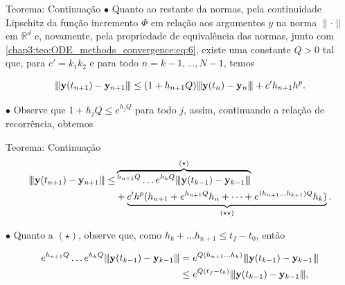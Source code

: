 \documentclass{beamer}
\newcommand{\vertiii}[1]{{\left\vert\kern-0.25ex\left\vert\kern-0.25ex\left\vert #1 
    \right\vert\kern-0.25ex\right\vert\kern-0.25ex\right\vert}}
\theoremstyle{plain}
\theoremstyle{definition}
\begin{document}

\begin{frame}{Teorema: Continuação}
    \phantom{aa} $\bullet$ Quanto ao restante da normas, pela continuidade Lipschitz da função incremento \(\Phi\) em relação aos argumentos \(y\) na norma \(\|\cdot\|\) em \(\mathbb{R}^{d}\) e, novamente, pela propriedade de equivalência das normas, junto com \eqref{chap3:teo:ODE_methods_convergence:eq:6}, existe uma constante \(Q>0\) tal que, para $c' = k_1 k_2$ e para todo $n = k - 1, \dots, N -1$, temos

    \[
      \vertiii{\mathbf{y}(t_{n+1})-\mathbf{y}_{n+1}} \leq (1+h_{n+1} Q) \vertiii{\mathbf{y}(t_{n})-\mathbf{y}_{n}} 
      +c^{\prime} h_{n+1} h^{p}.
    \]

    \phantom{aa} $\bullet$ Observe que $1 + h_j Q \leq e^{h_j Q}$ para todo $j$, assim, continuando a relação de recorrência, obtemos

\end{frame}



\begin{frame}{Teorema: Continuação}
    \begin{align*}
        \vertiii{\mathbf{y}(t_{n+1})-\mathbf{y}_{n+1}} \leq & \overbrace{^{h_{n+1}Q} \dots e^{h_{k}Q} \vertiii{\mathbf{y}(t_{k-1})-\mathbf{y}_{k-1}}}^{(\star)} \\
                                                            &+ \underbrace{c' h^p (h_{n+1} + e^{h_{n+1}Q}h_n + \dots + e^{(h_{n+1} \dots h_{k+1})Q}h_k)}_{(\star \star)}.
    \end{align*}

    \phantom{aa} $\bullet$ Quanto a $(\star)$, observe que, como $h_k + \dots h_{n+1} \leq t_f - t_0$, então

    \begin{align*}
      e^{h_{n+1}Q} \dots e^{h_{k}Q} \vertiii{\mathbf{y}(t_{k-1})-\mathbf{y}_{k-1}} &= e^{Q(h_{n+1} \dots h_k)} \vertiii{\mathbf{y}(t_{k-1})-\mathbf{y}_{k-1}} \\
                                                                                   &\leq e^{Q(t_f - t_0)} \vertiii{\mathbf{y}(t_{k-1})-\mathbf{y}_{k-1}},
    \end{align*}
\end{frame}
\end{document}
